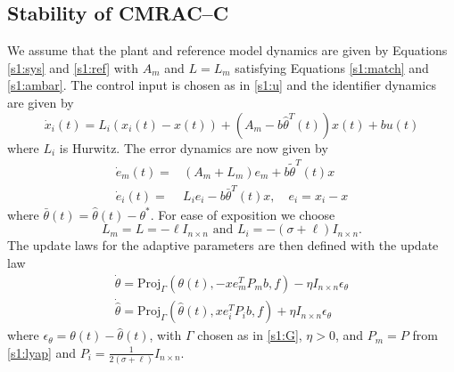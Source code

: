 \documentclass[10pt,journal]{IEEEtran}
\theoremstyle{plain}%
\theoremstyle{definition}
\newcommand{\be}[0]{\begin{equation}}
\newcommand{\ee}[0]{\end{equation}}
\begin{document}
\subsection{Stability of CMRAC--C}
We assume that the plant and reference model dynamics are given by Equations \eqref{s1:sys} and \eqref{s1:ref} with $A_m$ and $L=L_m$ satisfying Equations \eqref{s1:match} and \eqref{s1:ambar}. The control input is chosen as in \eqref{s1:u}
and the identifier dynamics are given by
\be\label{s8:o}
\dot x_i(t) = L_i (x_i(t) - x(t)) + (A_m- b\hat \theta^T(t) )x(t) + b u(t)
\ee
where $L_i$ is Hurwitz. The error dynamics are now given by
\be
\begin{split}\label{s8:e}
\dot e_m(t) =& (A_m+L_m) e_m +b \tilde \theta ^T (t)x\ \\
\dot e_i(t) =& L_i e_i -b \bar \theta ^T (t)x, \quad e_i=x_i-x
\end{split}
\ee
where ${\bar\theta(t)=\hat\theta(t)-\theta^*}$. For ease of exposition we choose
\be\label{s8:l}
L_m=L= -\ell  I_{n\times n} \text{ and } L_i=-(\sigma+\ell)I_{n\times n}.
\ee
The update laws for the adaptive parameters are then defined with the update law
\be\label{s8:law}\begin{split}
\dot \theta = \text{Proj}_\Gamma  (\theta(t),-x e_{m}^T P_m b,f)  - \eta I_{n\times n} \epsilon_\theta\\
\dot {\hat \theta} = \text{Proj}_\Gamma (\hat\theta(t), x e_i^T P_i b,f)+\eta I_{n\times n} \epsilon_\theta
\end{split}\ee
where $\epsilon_\theta = \theta(t) - \hat\theta(t)$, with $\Gamma$ chosen as in \eqref{s1:G}, ${\eta>0}$, and ${P_m=P}$ from \eqref{s1:lyap} and ${P_i=\frac{1}{2(\sigma+\ell)}I_{n\times n}}$.
\end{document}
